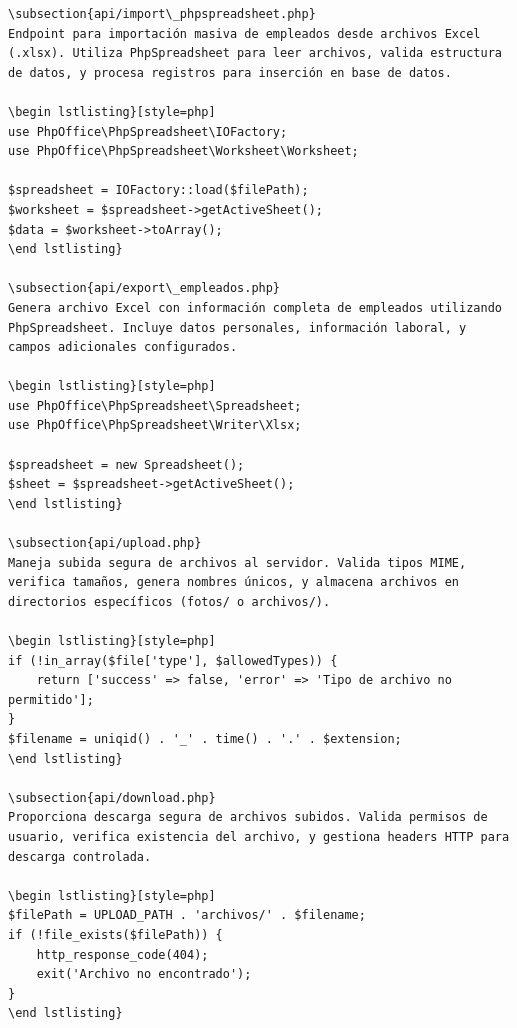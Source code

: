 \documentclass[12pt,a4paper]{article}
\begin{document}
\begin{lstlisting}[style=php]
\subsection{api/import\_phpspreadsheet.php}
Endpoint para importación masiva de empleados desde archivos Excel (.xlsx). Utiliza PhpSpreadsheet para leer archivos, valida estructura de datos, y procesa registros para inserción en base de datos.

\begin lstlisting}[style=php]
use PhpOffice\PhpSpreadsheet\IOFactory;
use PhpOffice\PhpSpreadsheet\Worksheet\Worksheet;

$spreadsheet = IOFactory::load($filePath);
$worksheet = $spreadsheet->getActiveSheet();
$data = $worksheet->toArray();
\end lstlisting}

\subsection{api/export\_empleados.php}
Genera archivo Excel con información completa de empleados utilizando PhpSpreadsheet. Incluye datos personales, información laboral, y campos adicionales configurados.

\begin lstlisting}[style=php]
use PhpOffice\PhpSpreadsheet\Spreadsheet;
use PhpOffice\PhpSpreadsheet\Writer\Xlsx;

$spreadsheet = new Spreadsheet();
$sheet = $spreadsheet->getActiveSheet();
\end lstlisting}

\subsection{api/upload.php}
Maneja subida segura de archivos al servidor. Valida tipos MIME, verifica tamaños, genera nombres únicos, y almacena archivos en directorios específicos (fotos/ o archivos/).

\begin lstlisting}[style=php]
if (!in_array($file['type'], $allowedTypes)) {
    return ['success' => false, 'error' => 'Tipo de archivo no permitido'];
}
$filename = uniqid() . '_' . time() . '.' . $extension;
\end lstlisting}

\subsection{api/download.php}
Proporciona descarga segura de archivos subidos. Valida permisos de usuario, verifica existencia del archivo, y gestiona headers HTTP para descarga controlada.

\begin lstlisting}[style=php]
$filePath = UPLOAD_PATH . 'archivos/' . $filename;
if (!file_exists($filePath)) {
    http_response_code(404);
    exit('Archivo no encontrado');
}
\end lstlisting}


\end{lstlisting}
\end{document}
